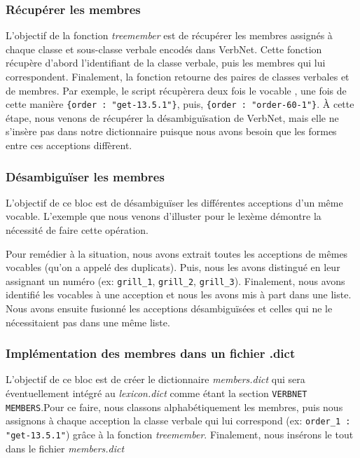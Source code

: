 \subsubsection{Récupérer les membres}
L'objectif de la fonction \emph{treemember} est de récupérer les membres assignés à chaque classe et sous-classe verbale encodés dans VerbNet. Cette fonction récupère d'abord l'identifiant de la classe verbale, puis les membres qui lui correspondent. Finalement, la fonction retourne des paires de classes verbales et de membres. Par exemple, le script récupèrera deux fois le vocable , une fois de cette manière \lstinline|{order : "get-13.5.1"}|, puis, \lstinline|{order : "order-60-1"}|. À cette étape, nous venons de récupérer la désambiguïsation de VerbNet, mais elle ne s'insère pas dans notre dictionnaire puisque nous avons besoin que les formes entre ces acceptions diffèrent.

\subsubsection{Désambiguïser les membres}

L'objectif de ce bloc est de désambiguïser les différentes acceptions d'un même vocable. L'exemple que nous venons d'illuster pour le lexème  démontre la nécessité de faire cette opération.

Pour remédier à la situation, nous avons extrait toutes les acceptions de mêmes vocables (qu'on a appelé des duplicats). Puis, nous les avons distingué en leur assignant un numéro (ex: \texttt{grill\_1}, \texttt{grill\_2}, \texttt{grill\_3}). Finalement, nous avons identifié les vocables à une acception et nous les avons mis à part dans une liste. Nous avons ensuite fusionné les acceptions désambiguïsées et celles qui ne le nécessitaient pas dans une même liste.

\subsubsection{Implémentation des membres dans un fichier .dict}

L'objectif de ce bloc est de créer le dictionnaire \emph{members.dict} qui sera éventuellement intégré au \emph{lexicon.dict} comme étant la section \texttt{VERBNET MEMBERS}.Pour ce faire, nous classons alphabétiquement les membres, puis nous assignons à chaque acception la classe verbale qui lui correspond (ex: \lstinline|order_1 : "get-13.5.1"|) grâce à la fonction \emph{treemember}. Finalement, nous insérons le tout dans le fichier \emph{members.dict}



